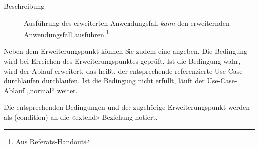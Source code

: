 \documentclass{bschlangaul-theorie}
\begin{document}
\begin{description}
\begin{description}
\item[Beschreibung]

Ausführung des erweiterten Anwendungsfall \emph{kann} den erweiternden
Anwendungsfall ausführen.\footnote{Aus Referats-Handout}
\end{description}


Neben dem Erweiterungspunkt können Sie zudem eine  angeben. Die Bedingung wird bei Erreichen des
Erweiterungspunktes geprüft. Ist die Bedingung wahr, wird der
Ablauf erweitert, das heißt, der entsprechende referenzierte Use-Case
durchlaufen durchlaufen. Ist die Bedingung nicht erfüllt, läuft der
Use-Case-Ablauf „normal“ weiter.

Die entsprechenden Bedingungen und der zugehörige Erweiterungspunkt
werden als  (condition) an die «extend»-Beziehung
notiert.

\begin{center}
\end{center}

\end{description}

\literatur
\end{document}
